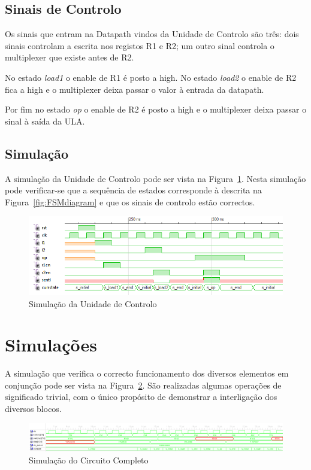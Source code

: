 \documentclass[a4paper]{article}
\begin{document}
\subsection{Sinais de Controlo}
Os sinais que entram na Datapath vindos da Unidade de Controlo são três: dois sinais controlam a escrita nos registos R1 e R2; um outro sinal controla o multiplexer que existe antes de R2.

No estado \textit{load1} o enable de R1 é posto a high. No estado \textit{load2} o enable de R2 fica a high e o multiplexer deixa passar o valor à entrada da datapath.

Por fim no estado \textit{op} o enable de R2 é posto a high e o multiplexer deixa passar o sinal à saída da ULA.

\subsection{Simulação}
A simulação da Unidade de Controlo pode ser vista na Figura~\ref{fig:controlo_sim}. Nesta simulação pode verificar-se que a sequência de estados corresponde à descrita na Figura~\ref{fig:FSMdiagram} e que os sinais de controlo estão correctos.

\begin{figure}[H]
	\centering
	\includegraphics[width=\textwidth]{control_sim}
	\caption{Simulação da Unidade de Controlo}
	\label{fig:controlo_sim}
\end{figure}

\pagebreak


\section{Simulações}
A simulação que verifica o correcto funcionamento dos diversos elementos em conjunção pode ser vista na Figura~\ref{fig:circuit_sim}. São realizadas algumas operações de significado trivial, com o único propósito de demonstrar a interligação dos diversos blocos. 

\begin{figure}[H]
	\centering
	\includegraphics[width=\textwidth]{circuit_sim}
	\caption{Simulação do Circuito Completo}
	\label{fig:circuit_sim}
\end{figure}
\end{document}
